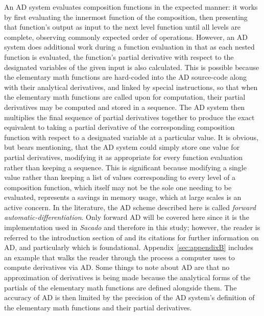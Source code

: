 \documentclass[preprint,12pt]{elsarticle}
\begin{document}
An AD system evaluates composition functions in the expected manner: it works
by first evaluating the innermost function of the composition, then presenting
that function's output as input to the next level function until all levels are
complete, observing commonly expected order of operations. However, an AD
system does additional work during a function evaluation in that as each nested
function is evaluated, the function's partial derivative with respect to the
designated variables of the given input is also calculated.  This is possible
because the elementary math functions are hard-coded into the AD source-code
along with their analytical derivatives, and linked by special instructions, so
that when the elementary math functions are called upon for computation, their
partial derivatives may be computed and stored in a sequence. The AD system
then multiplies the final sequence of partial derivatives together to produce
the exact equivalent to taking a partial derivative of the corresponding
composition function with respect to a designated variable at a particular
value. It is obvious, but bears mentioning, that the AD system could simply
store one value for partial derivatives, modifying it as appropriate for every
function evaluation rather than keeping a sequence. This is significant because
modifying a single value rather than keeping a list of values corresponding to
every level of a composition function, which itself may not be the sole one
needing to be evaluated, represents a savings in memory usage, which at large
scales is an active concern. In the literature, the AD scheme described here is
called \emph{forward automatic-differentiation}. Only forward AD will be
covered here since it is the implementation used in \emph{Sacado} and therefore
in this study; however, the reader is referred to the introduction section of
\cite{ref-AD-methods} and its citations for further information on AD, and
particularly \cite{ref-on-AD} which is foundational.
Appendix~\ref{sec:appendixB} includes an example that walks the reader through
the process a computer uses to compute derivatives via AD.  Some things to note
about AD are that no approximation of derivatives is being made because the
analytical forms of the partials of the elementary math functions are defined
alongside them. The accuracy of AD is then limited by the precision of the AD
system's definition of the elementary math functions and their partial
derivatives.
 
\end{document}
